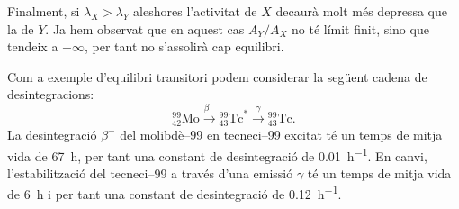 \documentclass[12pt,a4paper]{article}
\begin{document}
Finalment, si \( \lambda_X > \lambda_Y \) aleshores l'activitat de \( X \) decaurà molt més depressa que la de \( Y \). Ja hem observat que en aquest cas \( A_Y/A_X \) no té límit finit, sino que tendeix a \( -\infty \), per tant no s'assolirà cap equilibri. 

Com a exemple d'equilibri transitori podem considerar la següent cadena de desintegracions:
\begin{equation*}
	{}_{42}^{99} \mathrm{Mo} \xrightarrow{\beta^-} {}_{43}^{99} \mathrm{Tc}^{\ast} \xrightarrow{\gamma} {}_{43}^{99} \mathrm{Tc}.
\end{equation*}
La desintegració \( \beta^- \) del molibdè--99 en tecneci--99 excitat té un temps de mitja vida de \SI{67}{h}, per tant una constant de desintegració de \SI{0.01}{h^{-1}}. En canvi, l'estabilització del tecneci--99 a través d'una emissió \( \gamma \) té un temps de mitja vida de \SI{6}{h} i per tant una constant de desintegració de \SI{0.12}{h^{-1}}.
\end{document}
